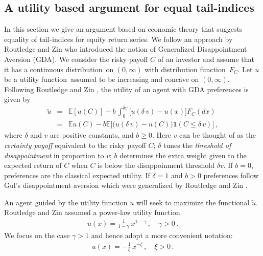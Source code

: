 \documentclass[11pt,a4]{amsart}
\newcommand{\blue}{\color{darkblue}}
\newcommand{\df}{distribution function}
\newcommand{\beao}{\begin{eqnarray*}}
\newcommand{\eeao}{\end{eqnarray*}\noindent}
\newcommand{\beam}{\begin{eqnarray}}
\newcommand{\eeam}{\end{eqnarray}\noindent}
\newcommand{\wt}{\widetilde}
\newcommand{\fct}{function}
\newcommand{\ds}{distribution}
\newcommand{\E }{{\mathbb E}}
\newcommand{\1}{{\mathbf 1}}
\begin{document}
\subsection{A utility based argument for equal tail-indices}\label{sec:3}
In this section we give an argument based on economic theory that
suggests equality of  tail-indices for equity return series.
We follow an approach by Routledge and Zin
\cite{routledge2010generalized} who introduced the notion of
Generalized Disappointment Aversion (GDA). We consider the risky
payoff $C$ of an investor and assume that it has a continuous \ds\ on
$(0,\infty)$ with \df\ $F_C$. Let $u$ be a utility \fct\ assumed to be
increasing and concave on $(0,\infty)$.  Following Routledge and Zin
\cite{routledge2010generalized},
the utility of an agent with GDA preferences is given by
\beao%
  \wt u&=& \E [u(C)] - b\, \int_{0}^{\delta v}
  \big[ u(\delta \,v) - u(x) \big] F_C(dx)\nonumber\\
  &=&
  \E u(C) - b \E\big[\big(u(\delta \,v) - u(C)\big)\1( C \le  \delta \,v)\big]\,,
\eeao
where $\delta $ and $v$ are positive constants, and $b\ge 0$.
  Here $v$ can be thought of as the {\em certainty payoff} equivalent to the
 risky payoff $C$; $\delta$ tunes the {\em threshold of 
   disappointment} in proportion to $v$; $b$ determines the extra
 weight given to the expected return of $C$ when $C$ is below the
 disappoinment threshold $\delta v$.
 If $b=0$, preferences are the classical expected utility. If
 $\delta=1$ and $b>0$ preferences follow Gul's \cite{gul:1991} 
disappointment aversion which were generalized by Routledge and Zin
\cite{routledge2010generalized}.
\par
An agent guided by the utility function $u$ will seek to maximize the
\fct al $\wt u$.
Routledge and Zin assumed a power-law utility function 
\beam\label{eq:u}
u(x)=\frac{1}{1 - \gamma}\,x^{1 - \gamma}\,,\quad \gamma>0\,. 
\eeam
We focus on the case $\gamma > 1$ and hence adopt a more convenient
notation:
\beam\label{eq:hjyr}
u(x)=-\frac{1}{\xi}\,x^{-\xi}\,,\quad \xi>0\,. 
\eeam
\end{document}
